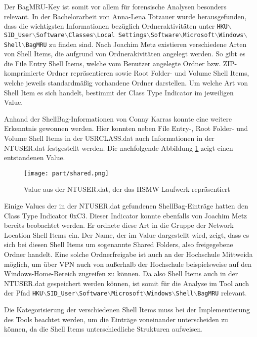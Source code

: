 Der \glqq BagMRU\grqq{}-Key ist somit vor allem für forensische Analysen besonders relevant. In der Bachelorarbeit von Anna-Lena Totzauer wurde herausgefunden, dass die wichtigsten Informationen bezüglich Ordneraktivitäten unter \texttt{HKU$\backslash$SID\_User$\backslash$Software$\backslash$Classes$\backslash$Local Settings$\backslash$Software$\backslash$Microsoft$\backslash$Windows$\backslash$Shell$\backslash$BagMRU} zu finden sind.  \cite{ba} \newline
Nach Joachim Metz existieren verschiedene Arten von Shell Items, die aufgrund von Ordnerakivitäten angelegt werden. So gibt es die File Entry Shell Items, welche vom Benutzer angelegte Ordner bzw. ZIP-komprimierte Ordner repräsentieren sowie Root Folder- und Volume Shell Items, welche jeweils standardmäßig vorhandene Ordner darstellen. Um welche Art von Shell Item es sich handelt, bestimmt der Class Type Indicator im jeweiligen Value. \cite{shelltype} 

Anhand der ShellBag-Informationen von Conny Karras konnte eine weitere Erkenntnis gewonnen werden. Hier konnten neben File Entry-, Root Folder- und Volume Shell Items in der USRCLASS.dat auch Informationen in der NTUSER.dat festgestellt werden. Die nachfolgende Abbildung \ref{img:net} zeigt einen entstandenen Value.

\begin{figure}[H]
	\centering
	\texttt{[image: part/shared.png]}
	\caption{Value aus der NTUSER.dat, der das HSMW-Laufwerk repräsentiert} 
	\label{img:net}
\end{figure}

Einige Values der in der NTUSER.dat gefundenen ShellBag-Einträge hatten den Class Type Indicator 0xC3. Dieser Indicator konnte ebenfalls von Joachim Metz bereits beobachtet werden. Er ordnete diese Art in die Gruppe der Network Location Shell Items ein. Der Name, der im Value dargestellt wird, zeigt, dass es sich bei diesen Shell Items um sogenannte Shared Folders, also freigegebene Ordner handelt. Eine solche Ordnerfreigabe ist auch an der Hochschule Mittweida möglich, um über VPN auch von außerhalb der Hochschule beispielsweise auf den Windows-Home-Bereich zugreifen zu können. Da also Shell Items auch in der NTUSER.dat gespeichert werden können, ist somit für die Analyse im Tool auch der Pfad \texttt{HKU$\backslash$SID\_User$\backslash$Software$\backslash$Microsoft$\backslash$Windows$\backslash$Shell$\backslash$BagMRU} relevant. \cite{shelltype,hsmw}

Die Kategorisierung der verschiedenen Shell Items muss bei der Implementierung des Tools beachtet werden, um die Einträge voneinander unterscheiden zu können, da die Shell Items unterschiedliche Strukturen aufweisen.

